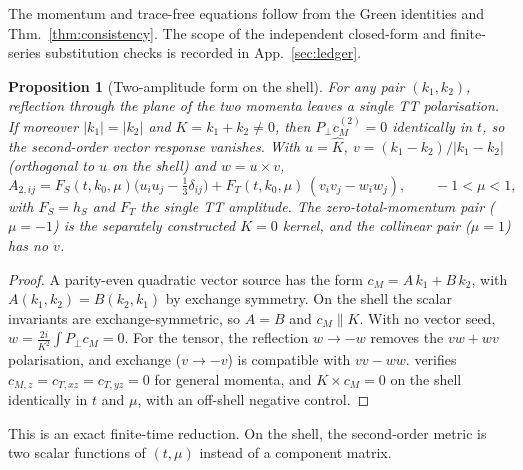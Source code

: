 \documentclass[11pt]{article}
\newtheorem{proposition}[theorem]{Proposition}
\theoremstyle{definition}
\theoremstyle{remark}
\begin{document}
The momentum and trace-free equations follow from the Green identities and
Thm.~\ref{thm:consistency}. The scope of the independent closed-form and finite-series
substitution checks is recorded in App.~\ref{sec:ledger}.

\begin{proposition}[Two-amplitude form on the shell]\label{prop:shell-two}
For any pair $(k_1,k_2)$, reflection through the plane of the two momenta leaves a single TT
polarisation. If moreover $|k_1|=|k_2|$ and $K=k_1+k_2\neq0$, then $P_\perp c_M^{(2)}=0$
identically in $t$, so the second-order vector response vanishes. With $u=\hat K$,
$v=(k_1-k_2)/|k_1-k_2|$ (orthogonal to $u$ on the shell) and $w=u\times v$,
\begin{equation}\label{eq:shell-two}
\boxed{A_{2,ij}=F_S(t,k_0,\mu)\Big(u_iu_j-\tfrac13\delta_{ij}\Big)+F_T(t,k_0,\mu)\,(v_iv_j-w_iw_j),\qquad-1<\mu<1,}
\end{equation}
with $F_S=h_S$ and $F_T$ the single TT amplitude. The zero-total-momentum pair ($\mu=-1$) is
the separately constructed $K=0$ kernel, and the collinear pair ($\mu=1$) has no $v$.
\end{proposition}
\begin{proof}
A parity-even quadratic vector source has the form $c_M=A\,k_1+B\,k_2$, with $A(k_1,k_2)=B(k_2,k_1)$
by exchange symmetry. On the shell the scalar invariants are exchange-symmetric, so $A=B$ and
$c_M\parallel K$. With no vector seed, $w=\frac{2i}{K^2}\int P_\perp c_M=0$. For the tensor, the
reflection $w\to-w$ removes the $vw+wv$ polarisation, and exchange ($v\to-v$) is compatible with
$vv-ww$.  verifies $c_{M,z}=c_{T,xz}=c_{T,yz}=0$ for general
momenta, and $K\times c_M=0$ on the shell identically in $t$ and $\mu$, with an off-shell negative
control.
\end{proof}
This is an exact finite-time reduction. On the shell, the second-order metric is two scalar
functions of $(t,\mu)$ instead of a component matrix.
\end{document}
